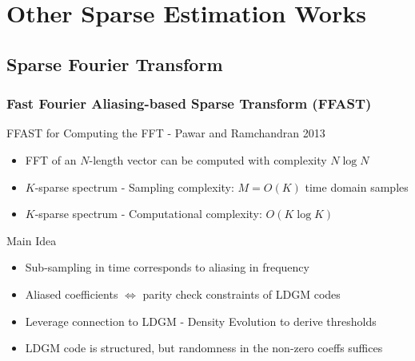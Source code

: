 \documentclass[10pt,xcolor=table]{beamer}
\begin{document}
\section{Other Sparse Estimation Works}

\subsection{Sparse Fourier Transform}


\begin{frame} \frametitle{Fast Fourier Aliasing-based Sparse Transform (FFAST) }

\begin{block}{FFAST for Computing the FFT - Pawar and Ramchandran 2013}
	\begin{itemize}
		\item FFT of an $N$-length vector can be computed with complexity $N \log N$
		\item $K$-sparse spectrum - \alert{{Sampling complexity:}} $M = O(K)$ time domain samples
		\item $K$-sparse spectrum - \alert{{Computational complexity:}} $O(K \log{K})$
	\end{itemize}
\end{block}


\begin{block}{Main Idea}
	\begin{itemize}
		\item \alert{Sub-sampling} in time corresponds to \alert{aliasing} in frequency
		\item Aliased coefficients $\Leftrightarrow$ parity check constraints of LDGM codes
		\item Leverage connection to LDGM - Density Evolution to derive thresholds
		\item LDGM code is structured, but randomness in the non-zero coeffs suffices
	\end{itemize}
\end{block}



\end{frame}
\end{document}
